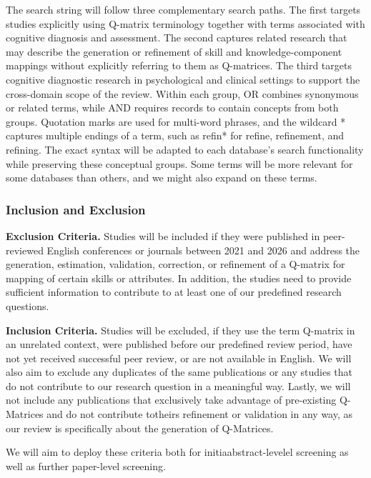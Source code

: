 \documentclass[sigconf]{acmart}
\begin{document}
The search string will follow three complementary search paths. The first targets studies explicitly using Q-matrix terminology together with terms associated with cognitive diagnosis and assessment. The second captures related research that may describe the generation or refinement of skill and knowledge-component mappings without explicitly referring to them as Q-matrices. The third targets cognitive diagnostic research in psychological and clinical settings to support the cross-domain scope of the review. Within each group, OR combines synonymous or related terms, while AND requires records to contain concepts from both groups. Quotation marks are used for multi-word phrases, and the wildcard * captures multiple endings of a term, such as refin* for refine, refinement, and refining. The exact syntax will be adapted to each database's search functionality while preserving these conceptual groups. Some terms will be more relevant for some databases than others, and we might also expand on these terms.

\subsubsection{\textbf{Inclusion and Exclusion}}

\textbf{Exclusion Criteria.} Studies will be included if they were published in peer-reviewed English conferences or journals between 2021 and 2026 and address the generation, estimation, validation, correction, or refinement of a Q-matrix for mapping of certain skills or attributes. In addition, the studies need to provide sufficient information to contribute to at least one of our predefined research questions.

\textbf{Inclusion Criteria.} Studies will be excluded, if they use the term Q-matrix in an unrelated context, were published before our predefined review period, have not yet received successful peer review, or are not available in English. We will also aim to exclude any duplicates of the same publications or any studies that do not contribute to our research question in a meaningful way. Lastly, we will not include any publications that exclusively take advantage of pre-existing Q-Matrices and do not contribute totheirs refinement or validation in any way, as our review is specifically about the generation of Q-Matrices.

We will aim to deploy these criteria both for initiaabstract-levelel screening as well as further paper-level screening.
\end{document}
